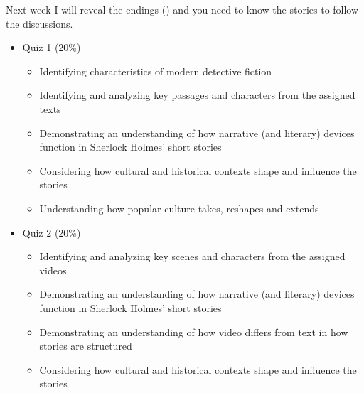 \documentclass[a4paper,landscape,headrule,footrule,xetex,25pt]{foils}
\begin{document}
Next week I will reveal the endings () and you need to know the stories to follow the discussions.

\begin{itemize}
\item Quiz 1 (20\%)
  \begin{itemize}
  \item     Identifying characteristics of modern detective fiction
  \item     Identifying and analyzing key passages and characters from the assigned texts
  \item     Demonstrating an understanding of how narrative (and literary) devices function in Sherlock Holmes’ short stories
  \item     Considering how cultural and historical contexts shape and influence the stories
  \item     Understanding how popular culture takes, reshapes and extends 
  \end{itemize}
\newpage
\item   Quiz 2 (20\%)
  \begin{itemize}
  \item      Identifying and analyzing key scenes and characters from the assigned videos
  \item     Demonstrating an understanding of how narrative (and literary) devices function in Sherlock Holmes’ short stories
  \item     Demonstrating an understanding of how video differs from text in how stories are structured
  \item     Considering how cultural and historical contexts shape and influence the stories 
  \end{itemize}
\end{itemize}


\end{document}
